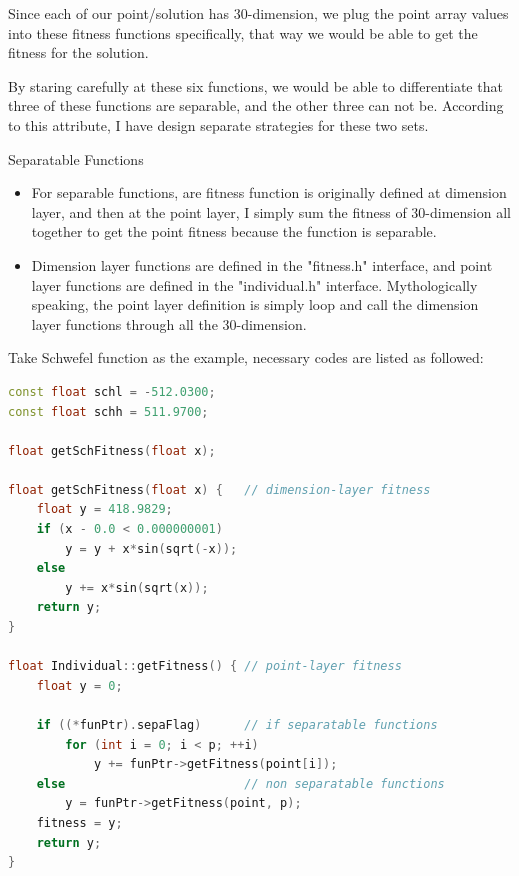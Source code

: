 \documentclass[b5paper,11pt, abstraction, titlepage]{scrartcl}
\begin{document}
\begin{CJK}{UTF8}{gbsn}
Since each of our point/solution has 30-dimension, we plug the point array values into these fitness functions specifically, that way we would be able to get the fitness for the solution.

By staring carefully at these six functions, we would be able to differentiate that three of these functions are separable, and the other three can not be. According to this attribute, I have design separate strategies for these two sets.

\begin{description}
  \itemsep=-3pt
\item{Separatable Functions}
  \begin{itemize}
    \itemsep=-3pt
  \item For separable functions, are fitness function is originally defined at dimension layer, and then at the point layer, I simply sum the fitness of 30-dimension all together to get the point fitness because the function is separable.
  \item Dimension layer functions are defined in the "fitness.h" interface, and point layer functions are defined in the "individual.h" interface. Mythologically speaking, the point layer definition is simply loop and call the dimension layer functions through all the 30-dimension.
  \end{itemize}
  Take Schwefel function as the example, necessary codes are listed as followed: 
\begin{lstlisting}[language=c++]
const float schl = -512.0300; 
const float schh = 511.9700; 

float getSchFitness(float x);

float getSchFitness(float x) {   // dimension-layer fitness
    float y = 418.9829;
    if (x - 0.0 < 0.000000001) 
	    y = y + x*sin(sqrt(-x));
    else
	    y += x*sin(sqrt(x));
    return y;
}

float Individual::getFitness() { // point-layer fitness
    float y = 0;
    
    if ((*funPtr).sepaFlag)      // if separatable functions
        for (int i = 0; i < p; ++i) 
            y += funPtr->getFitness(point[i]);		
    else                         // non separatable functions   
        y = funPtr->getFitness(point, p);
    fitness = y;
    return y;
}
\end{lstlisting}
  

\end{description}
\end{CJK}
\end{document}
